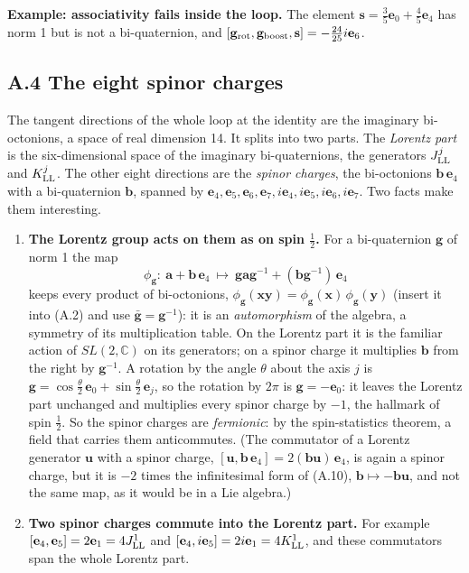 \documentclass[
  10pt,
]{article}
\providecommand{\tightlist}{%
  \setlength{\itemsep}{0pt}\setlength{\parskip}{0pt}}
\begin{document}
\textbf{Example: associativity fails inside the loop.} The element
\(\mathbf s=\tfrac{3}{5}\mathbf e_{0}+\tfrac{4}{5}\mathbf e_{4}\) has
norm 1 but is not a bi-quaternion, and
\([\mathbf g_{\rm rot},\mathbf g_{\rm boost},\mathbf s]=-\tfrac{24}{25}i\mathbf e_{6}\).

\hypertarget{a.4-the-eight-spinor-charges}{%
\subsection{A.4 The eight spinor
charges}\label{a.4-the-eight-spinor-charges}}

The tangent directions of the whole loop at the identity are the
imaginary bi-octonions, a space of real dimension 14. It splits into two
parts. The \emph{Lorentz part} is the six-dimensional space of the
imaginary bi-quaternions, the generators \(J^j_{\rm LL}\) and
\(K^j_{\rm LL}\). The other eight directions are the \emph{spinor
charges}, the bi-octonions \(\mathbf b\,\mathbf e_4\) with a
bi-quaternion \(\mathbf b\), spanned by
\(\mathbf e_4,\mathbf e_5,\mathbf e_6,\mathbf e_7,i\mathbf e_4,i\mathbf e_5,i\mathbf e_6,i\mathbf e_7\).
Two facts make them interesting.

\begin{enumerate}
\def\labelenumi{\arabic{enumi}.}
\tightlist
\item
  \textbf{The Lorentz group acts on them as on spin \(\tfrac12\).} For a
  bi-quaternion \(\mathbf g\) of norm 1 the map
  \[\phi_{\mathbf g}:\ \mathbf a+\mathbf b\,\mathbf e_4\ \mapsto\ \mathbf g\mathbf a\mathbf g^{-1}+(\mathbf b\mathbf g^{-1})\,\mathbf e_4\tag{A.10}\]
  keeps every product of bi-octonions,
  \(\phi_{\mathbf g}(\mathbf x\mathbf y)=\phi_{\mathbf g}(\mathbf x)\,\phi_{\mathbf g}(\mathbf y)\)
  (insert it into (A.2) and use \(\bar{\mathbf g}=\mathbf g^{-1}\)): it
  is an \emph{automorphism} of the algebra, a symmetry of its
  multiplication table. On the Lorentz part it is the familiar action of
  \(SL(2,\mathbb C)\) on its generators; on a spinor charge it
  multiplies \(\mathbf b\) from the right by \(\mathbf g^{-1}\). A
  rotation by the angle \(\theta\) about the axis \(j\) is
  \(\mathbf g=\cos\tfrac\theta2\,\mathbf e_0+\sin\tfrac\theta2\,\mathbf e_j\),
  so the rotation by \(2\pi\) is \(\mathbf g=-\mathbf e_0\): it leaves
  the Lorentz part unchanged and multiplies every spinor charge by
  \(-1\), the hallmark of spin \(\tfrac12\). So the spinor charges are
  \emph{fermionic}: by the spin-statistics theorem, a field that carries
  them anticommutes. (The commutator of a Lorentz generator
  \(\mathbf u\) with a spinor charge,
  \([\mathbf u,\mathbf b\,\mathbf e_4]=2(\mathbf b\mathbf u)\,\mathbf e_4\),
  is again a spinor charge, but it is \(-2\) times the infinitesimal
  form of (A.10), \(\mathbf b\mapsto-\mathbf b\mathbf u\), and not the
  same map, as it would be in a Lie algebra.)
\item
  \textbf{Two spinor charges commute into the Lorentz part.} For example
  \([\mathbf e_4,\mathbf e_5]=2\mathbf e_{1}=4J^1_{\rm LL}\) and
  \([\mathbf e_4,i\mathbf e_5]=2i\mathbf e_{1}=4K^1_{\rm LL}\), and
  these commutators span the whole Lorentz part.
\end{enumerate}
\end{document}
